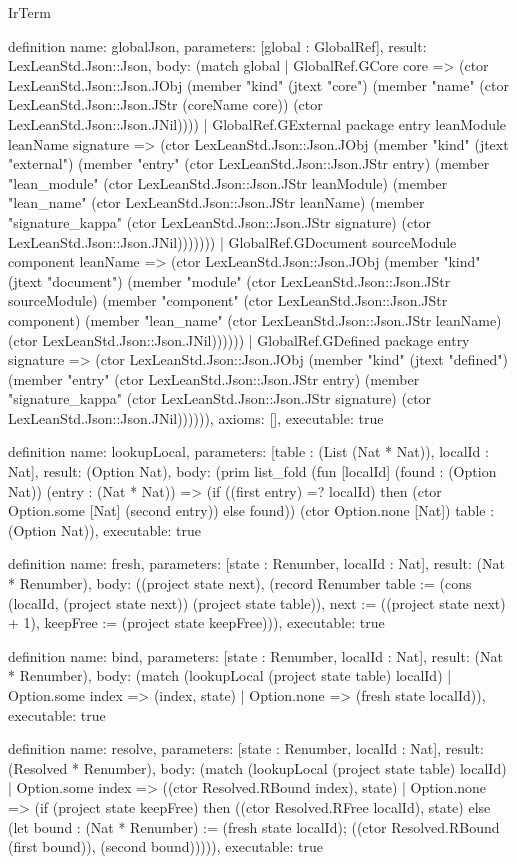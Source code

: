 \begin{lexlean}{IrTerm}
\begin{semanticmodule}
definition{
  name: globalJson,
  parameters: [global : GlobalRef],
  result: LexLeanStd.Json::Json,
  body: (match global
    | GlobalRef.GCore core => (ctor LexLeanStd.Json::Json.JObj (member "kind" (jtext "core") (member "name" (ctor LexLeanStd.Json::Json.JStr (coreName core)) (ctor LexLeanStd.Json::Json.JNil))))
    | GlobalRef.GExternal package entry leanModule leanName signature => (ctor LexLeanStd.Json::Json.JObj (member "kind" (jtext "external") (member "entry" (ctor LexLeanStd.Json::Json.JStr entry) (member "lean_module" (ctor LexLeanStd.Json::Json.JStr leanModule) (member "lean_name" (ctor LexLeanStd.Json::Json.JStr leanName) (member "signature_kappa" (ctor LexLeanStd.Json::Json.JStr signature) (ctor LexLeanStd.Json::Json.JNil)))))))
    | GlobalRef.GDocument sourceModule component leanName => (ctor LexLeanStd.Json::Json.JObj (member "kind" (jtext "document") (member "module" (ctor LexLeanStd.Json::Json.JStr sourceModule) (member "component" (ctor LexLeanStd.Json::Json.JStr component) (member "lean_name" (ctor LexLeanStd.Json::Json.JStr leanName) (ctor LexLeanStd.Json::Json.JNil))))))
    | GlobalRef.GDefined package entry signature => (ctor LexLeanStd.Json::Json.JObj (member "kind" (jtext "defined") (member "entry" (ctor LexLeanStd.Json::Json.JStr entry) (member "signature_kappa" (ctor LexLeanStd.Json::Json.JStr signature) (ctor LexLeanStd.Json::Json.JNil)))))),
  axioms: [],
  executable: true
}

definition{
  name: lookupLocal,
  parameters: [table : (List (Nat * Nat)), localId : Nat],
  result: (Option Nat),
  body: (prim list_fold (fun [localId] (found : (Option Nat)) (entry : (Nat * Nat)) => (if ((first entry) =? localId) then (ctor Option.some [Nat] (second entry)) else found)) (ctor Option.none [Nat]) table : (Option Nat)),
  executable: true
}

definition{
  name: fresh,
  parameters: [state : Renumber, localId : Nat],
  result: (Nat * Renumber),
  body: ((project state next), (record Renumber {table := (cons (localId, (project state next)) (project state table)), next := ((project state next) + 1), keepFree := (project state keepFree)})),
  executable: true
}

definition{
  name: bind,
  parameters: [state : Renumber, localId : Nat],
  result: (Nat * Renumber),
  body: (match (lookupLocal (project state table) localId)
    | Option.some index => (index, state)
    | Option.none => (fresh state localId)),
  executable: true
}

definition{
  name: resolve,
  parameters: [state : Renumber, localId : Nat],
  result: (Resolved * Renumber),
  body: (match (lookupLocal (project state table) localId)
    | Option.some index => ((ctor Resolved.RBound index), state)
    | Option.none => (if (project state keepFree) then ((ctor Resolved.RFree localId), state) else (let bound : (Nat * Renumber) := (fresh state localId); ((ctor Resolved.RBound (first bound)), (second bound))))),
  executable: true
}


\end{semanticmodule}
\end{lexlean}
